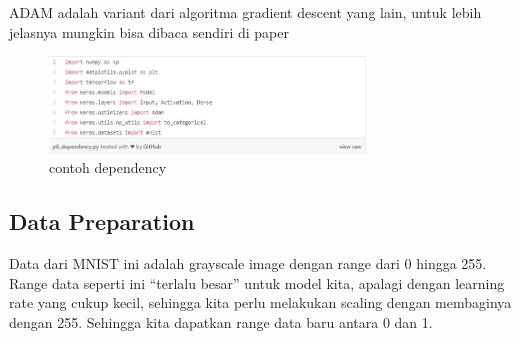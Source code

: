 ADAM adalah variant dari algoritma gradient descent yang lain, untuk lebih jelasnya mungkin bisa dibaca sendiri di paper 
\begin{figure}[!htp]
	\includegraphics[width=0.75\textwidth]{figures/Dependency.JPG}
	\caption{contoh dependency}
	\label{labelgambar}
\end{figure}

\subsection{Data Preparation}
Data dari MNIST ini adalah grayscale image dengan range dari 0 hingga 255. Range data seperti ini “terlalu besar” untuk model kita, apalagi dengan learning rate yang cukup kecil, sehingga kita perlu melakukan scaling dengan membaginya dengan 255. Sehingga kita dapatkan range data baru antara 0 dan 1.


